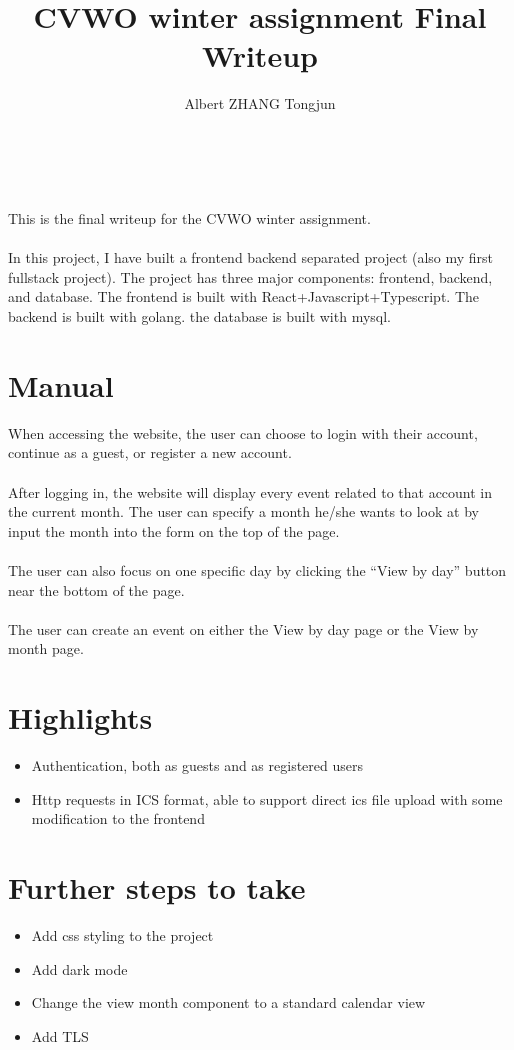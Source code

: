 \documentclass{article}[12pt]
\title{CVWO winter assignment Final Writeup}
\author{Albert ZHANG Tongjun}
\begin{document}
\maketitle
\tableofcontents
~\\~\\
This is the final writeup for the CVWO winter assignment.
~\\~\\
In this project, I have built a frontend backend separated project (also my first fullstack project).
The project has three major components: frontend, backend, and database.
The frontend is built with React+Javascript+Typescript. 
The backend is built with golang.
the database is built with mysql.

\section{Manual}
When accessing the website, the user can choose to login with their account, continue as a guest, or register a new account.
~\\~\\
After logging in, the website will display every event related to that account in the current month.
The user can specify a month he/she wants to look at by input the month into the form on the top of the page.
~\\~\\
The user can also focus on one specific day by clicking the ``View by day'' button near the bottom of the page.
~\\~\\
The user can create an event on either the View by day page or the View by month page.



\section{Highlights}
\begin{itemize}
    \item Authentication, both as guests and as registered users
    \item Http requests in ICS format, able to support direct ics file upload with some modification to the frontend
\end{itemize}

\section{Further steps to take}
\begin{itemize}
    \item Add css styling to the project
    \item Add dark mode
    \item Change the view month component to a standard calendar view
    \item Add TLS
\end{itemize}
\end{document}
